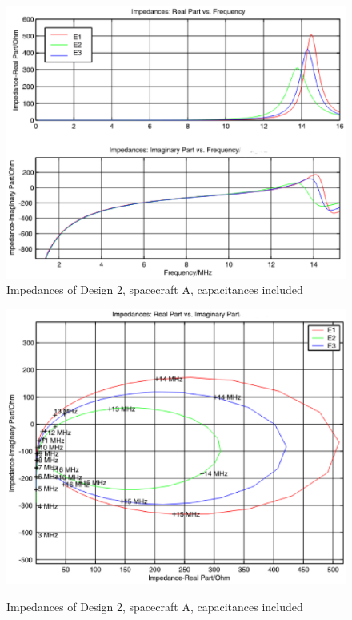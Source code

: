 \documentclass[a4paper,10pt]{thesis}
\begin{document}
\begin{figure}
\begin{center}
\includegraphics[scale=0.65]{ImpedancesD21_caps.eps}\\
\caption{Impedances of Design 2, spacecraft A, capacitances included} \label{fig_Impedance1_D2_caps}
\includegraphics[scale=0.65]{ImpedancesD22_caps.eps} \\
\caption{Impedances of Design 2, spacecraft A, capacitances included} \label{fig_Impedance2_D2_caps}
\end{center}
\end{figure}
\end{document}
